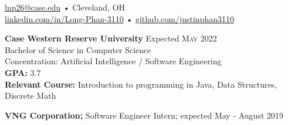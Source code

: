 \documentclass[a4paper,11pt]{article}
\begin{document}
 
 
\begin{center} 
\href{mailto:lnp26@case.edu}{lnp26@case.edu} • Cleveland, OH \\
\href{https://linkedin.com/in/Long-Phan-3110/}{linkedin.com/in/Long-Phan-3110} • \href{http://github.com/justinphan3110}{github.com/justinphan3110}
\noindent\makebox[\linewidth]{\rule{\paperwidth}{2pt}}
\end{center}

\begin{flushleft}
	\textbf{Case Western Reserve University } \hspace{1cm} Expected \textsc{May} 2022 \\
	Bachelor of Science in Computer Science \\
	Concentration: Artificial Intelligence / Software Engineering \\
	\textbf{\textsc{GPA:}} 3.7 \\ 
	\textbf{Relevant Course:} Introduction to programming in Java, Data Structures, Discrete Math \\
	\centering{\noindent\makebox{\rule{8cm}{1.5pt}}}
\end{flushleft}

\begin{flushleft}
	\textbf{VNG Corporation; } Software Engineer Intern; expected May - August 2019 \\
	\centering{\noindent\makebox{\rule{8cm}{1.5pt}}}
\end{flushleft} 
\end{document}

